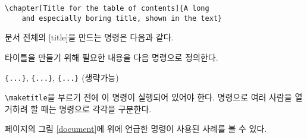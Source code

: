 \begin{code}
\verb|\chapter[Title for the table of contents]{A long|\\
\verb|    and especially boring title, shown in the text}|
\end{code}

문서 전체의 [title]을 만드는 명령은 다음과 같다.
\begin{lscommand}
\end{lscommand}
\noindent 타이틀을 만들기 위해 필요한 내용을 다음 명령으로 정의한다.
\begin{lscommand}
\verb|{...}|, \verb|{...}|,
\verb|{...}| (생략가능)
\end{lscommand}
\noindent \verb|\maketitle|을 부르기 전에 이 명령이 실행되어 있어야 한다.
 명령으로 여러 사람을 열거하려 할 때는  명령으로 각각을 구분한다.


\pageref{document}페이지의 그림 \ref{document}에 위에 언급한 명령이 사용된 사례를 볼 수 있다.

